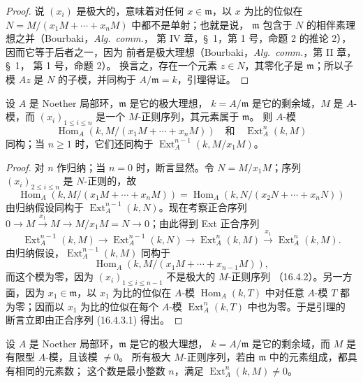 \begin{proof}
说 $(x_i)$ 是极大的，意味着对任何 $x\in\mathfrak{m}$，以 $x$ 为比的位似在
$N=M/(x_1M+\cdots+x_nM)$ 中都不是单射；也就是说，
$\mathfrak{m}$ 包含于 $N$ 的相伴素理想之并（Bourbaki，\emph{Alg.~comm.}，
第 IV 章，\S~1，第 1 号，命题 2 的推论 2），因而它等于后者之一，因为
前者是极大理想（Bourbaki，\emph{Alg.~comm.}，第 II 章，\S~1，
第 1 号，命题 2）。
换言之，存在一个元素 $z\in N$，其零化子是 $\mathfrak{m}$；所以子模 $Az$
是 $N$ 的子模，并同构于 $A/\mathfrak{m}=k$，引理得证。
\end{proof}

\begin{lemma}[16.4.3]
\label{0.16.4.3-fr}
设 $A$ 是 Noether 局部环，$\mathfrak{m}$ 是它的极大理想，
$k=A/\mathfrak{m}$ 是它的剩余域，$M$ 是 $A$-模，而
$(x_i)_{1\leq i\leq n}$ 是一个 $M$-正则序列，其元素属于 $\mathfrak{m}$。
则 $A$-模
\[
  \operatorname{Hom}_A(k,M/(x_1M+\cdots+x_nM))
  \quad\text{和}\quad \operatorname{Ext}^n_A(k,M)
\]
同构；当 $n\geq1$ 时，它们还同构于
$\operatorname{Ext}^{n-1}_A(k,M/x_1M)$。
\end{lemma}

\begin{proof}
对 $n$ 作归纳；当 $n=0$ 时，断言显然。令 $N=M/x_1M$；序列
$(x_i)_{2\leq i\leq n}$ 是 $N$-正则的，故
\[
  \operatorname{Hom}_A(k,M/(x_1M+\cdots+x_nM))
  =\operatorname{Hom}_A(k,N/(x_2N+\cdots+x_nN))
\]
由归纳假设同构于 $\operatorname{Ext}^{n-1}_A(k,N)$。现在考察正合序列
$0\to M\xrightarrow{x_1}M\to M/x_1M=N\to0$；由此得到 Ext 正合序列
\begin{equation}
\label{0.16.4.3.1-fr}
\tag{16.4.3.1}
  \operatorname{Ext}^{n-1}_A(k,M)
  \to\operatorname{Ext}^{n-1}_A(k,N)
  \to\operatorname{Ext}^n_A(k,M)
  \xrightarrow{x_1}\operatorname{Ext}^n_A(k,M).
\end{equation}
由归纳假设，$\operatorname{Ext}^{n-1}_A(k,M)$ 同构于
\[
  \operatorname{Hom}_A(k,M/(x_1M+\cdots+x_{n-1}M)),
\]
而这个模为零，因为 $(x_i)_{1\leq i\leq n-1}$ 不是极大的 $M$-正则序列
（16.4.2）。另一方面，因为 $x_1\in\mathfrak{m}$，以 $x_1$ 为比的位似在
$A$-模 $\operatorname{Hom}_A(k,T)$ 中对任意 $A$-模 $T$ 都为零；因而以 $x_1$
为比的位似在每个 $A$-模 $\operatorname{Ext}^n_A(k,T)$ 中也为零。于是引理的
断言立即由正合序列 (16.4.3.1) 得出。
\end{proof}

\begin{corollary}[16.4.4]
\label{0.16.4.4-fr}
设 $A$ 是 Noether 局部环，$\mathfrak{m}$ 是它的极大理想，
$k=A/\mathfrak{m}$ 是它的剩余域，而 $M$ 是有限型 $A$-模，且该模 $\neq0$。
所有极大 $M$-正则序列，若由 $\mathfrak{m}$ 中的元素组成，都具有相同的元素数；
这个数是最小整数 $n$，满足 $\operatorname{Ext}^n_A(k,M)\neq0$。
\end{corollary}

